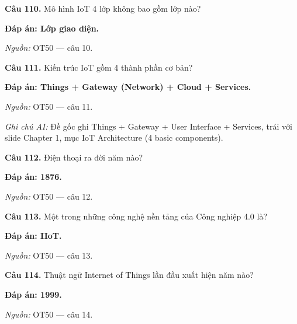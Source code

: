 \documentclass[11pt,a4paper]{article}
\begin{document}
\textbf{Câu 110.} Mô hình IoT 4 lớp không bao gồm lớp nào?\par
{\color{answer}\textbf{Đáp án: Lớp giao diện.}}\par
{\footnotesize\color{sourcegray}\textit{Nguồn:} OT50 — câu 10.\par}
\vspace{3pt}\par\noindent{\color{black!18}\rule{\linewidth}{0.3pt}}\par\medskip

\textbf{Câu 111.} Kiến trúc IoT gồm 4 thành phần cơ bản?\par
{\color{answer}\textbf{Đáp án: Things + Gateway (Network) + Cloud + Services.}}\par
{\footnotesize\color{sourcegray}\textit{Nguồn:} OT50 — câu 11.\par}
{\footnotesize\color{sourcegray}\textit{Ghi chú AI:} Đề gốc ghi Things + Gateway + User Interface + Services, trái với slide Chapter 1, mục IoT Architecture (4 basic components).\par}
\vspace{3pt}\par\noindent{\color{black!18}\rule{\linewidth}{0.3pt}}\par\medskip

\textbf{Câu 112.} Điện thoại ra đời năm nào?\par
{\color{answer}\textbf{Đáp án: 1876.}}\par
{\footnotesize\color{sourcegray}\textit{Nguồn:} OT50 — câu 12.\par}
\vspace{3pt}\par\noindent{\color{black!18}\rule{\linewidth}{0.3pt}}\par\medskip

\textbf{Câu 113.} Một trong những công nghệ nền tảng của Công nghiệp 4.0 là?\par
{\color{answer}\textbf{Đáp án: IIoT.}}\par
{\footnotesize\color{sourcegray}\textit{Nguồn:} OT50 — câu 13.\par}
\vspace{3pt}\par\noindent{\color{black!18}\rule{\linewidth}{0.3pt}}\par\medskip

\textbf{Câu 114.} Thuật ngữ Internet of Things lần đầu xuất hiện năm nào?\par
{\color{answer}\textbf{Đáp án: 1999.}}\par
{\footnotesize\color{sourcegray}\textit{Nguồn:} OT50 — câu 14.\par}
\vspace{3pt}\par\noindent{\color{black!18}\rule{\linewidth}{0.3pt}}\par\medskip
\end{document}
